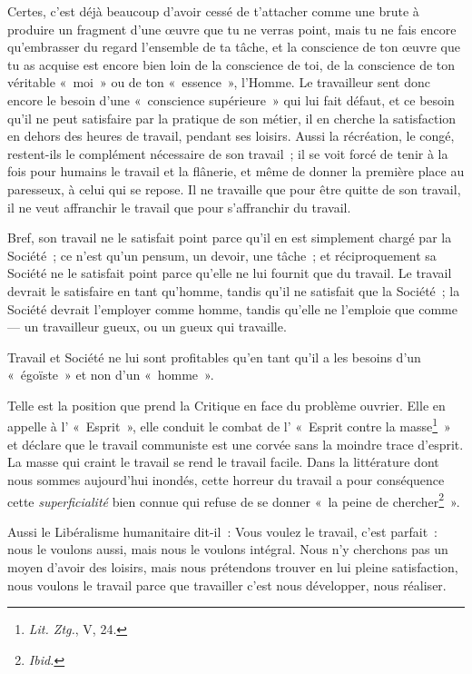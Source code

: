 \documentclass[french,twoside]{book} %
\begin{document}
Certes, c’est déjà beaucoup d’avoir cessé de t’attacher comme une brute à produire un fragment d’une œuvre que tu ne verras point, mais tu ne fais encore qu’embrasser du regard l’ensemble de ta tâche, et la conscience de ton œuvre que tu as acquise est encore bien loin de la conscience de toi, de la conscience de ton véritable « moi » ou de ton « essence », l’Homme. Le travailleur sent donc encore le besoin d’une « conscience supérieure » qui lui fait défaut, et ce besoin qu’il ne peut satisfaire par la pratique de son métier, il en cherche la satisfaction en dehors des heures de travail, pendant ses loisirs. Aussi la  récréation, le congé, restent-ils le complément nécessaire de son travail ; il se voit forcé de tenir à la fois pour humains le travail et la flânerie, et même de donner la première place au paresseux, à celui qui se repose. Il ne travaille que pour être quitte de son travail, il ne veut affranchir le travail que pour s’affranchir du travail.\par
Bref, son travail ne le satisfait point parce qu’il en est simplement chargé par la Société ; ce n’est qu’un pensum, un devoir, une tâche ; et réciproquement sa Société ne le satisfait point parce qu’elle ne lui fournit que du travail. Le travail devrait le satisfaire en tant qu’homme, tandis qu’il ne satisfait que la Société ; la Société devrait l’employer comme homme, tandis qu’elle ne l’emploie que comme — un travailleur gueux, ou un gueux qui travaille.\par
Travail et Société ne lui sont profitables qu’en tant qu’il a les besoins d’un « égoïste » et non d’un « homme ».\par
Telle est la position que prend la Critique en face du problème ouvrier. Elle en appelle à l’ « Esprit », elle conduit le combat de l’ « Esprit contre la masse\footnote{ \noindent \emph{Lit. Ztg.}, V, 24.
 } » et déclare que le travail communiste est une corvée sans la moindre trace d’esprit. La masse qui craint le travail se rend le travail facile. Dans la littérature dont nous sommes aujourd’hui inondés, cette horreur du travail a pour conséquence cette \emph{superficialité} bien connue qui refuse de se donner « la peine de chercher\footnote{ \noindent \emph{Ibid.}
 } ».\par
Aussi le Libéralisme humanitaire dit-il : Vous voulez le travail, c’est parfait : nous le voulons aussi, mais nous le voulons intégral. Nous n’y cherchons pas un moyen d’avoir des loisirs, mais nous prétendons trouver en lui pleine satisfaction, nous voulons le travail parce que travailler c’est nous développer, nous réaliser.\par
\end{document}
